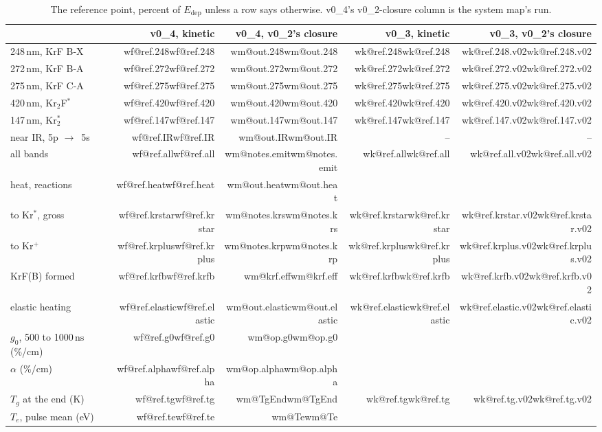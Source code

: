 \documentclass[11pt]{article}
\makeatletter
\newcommand\wk[1]{\ifcsname wk@#1\endcsname\csname wk@#1\endcsname
  \else\errmessage{no v0_3 number '#1'. Rerun make_overview_v0_3.py}\fi}
\newcommand\wm[1]{\ifcsname wm@#1\endcsname\csname wm@#1\endcsname
  \else\errmessage{no map number '#1'. Rerun make_system_map_v0_4.py}\fi}
\newcommand\wf[1]{\ifcsname wf@#1\endcsname\csname wf@#1\endcsname
  \else\errmessage{no v0_4 number '#1'. Rerun make_overview_v0_4.py}\fi}
\newcommand{\unit}[1]{\ensuremath{\,\mathrm{#1}}}
\newcommand{\Krs}{Kr\ensuremath{^*}}
\newcommand{\Krp}{Kr\ensuremath{^+}}
\newcommand{\Krts}{Kr\ensuremath{_2^*}}
\newcommand{\KtF}{Kr\ensuremath{_2}F\ensuremath{^*}}
\newcommand{\ra}{\ensuremath{\to}\ }
\newcommand{\Edep}{\ensuremath{E_\mathrm{dep}}}
\makeatother
\begin{document}
\begin{table}[H]
\centering\footnotesize
\begin{tabular}{@{}lrrrr@{}}
\toprule
 & v0\_4, kinetic & v0\_4, v0\_2's closure & v0\_3, kinetic & v0\_3, v0\_2's closure\\
\midrule
248\unit{nm}, KrF B-X & \wf{ref.248} & \wm{out.248} & \wk{ref.248} & \wk{ref.248.v02}\\
272\unit{nm}, KrF B-A & \wf{ref.272} & \wm{out.272} & \wk{ref.272} & \wk{ref.272.v02}\\
275\unit{nm}, KrF C-A & \wf{ref.275} & \wm{out.275} & \wk{ref.275} & \wk{ref.275.v02}\\
420\unit{nm}, \KtF{} & \wf{ref.420} & \wm{out.420} & \wk{ref.420} & \wk{ref.420.v02}\\
147\unit{nm}, \Krts{} & \wf{ref.147} & \wm{out.147} & \wk{ref.147} & \wk{ref.147.v02}\\
near IR, 5p \ra 5s & \wf{ref.IR} & \wm{out.IR} & -- & --\\
all bands & \wf{ref.all} & \wm{notes.emit} & \wk{ref.all} & \wk{ref.all.v02}\\
heat, reactions & \wf{ref.heat} & \wm{out.heat} & & \\
to \Krs{}, gross & \wf{ref.krstar} & \wm{notes.krs} & \wk{ref.krstar} & \wk{ref.krstar.v02}\\
to \Krp{} & \wf{ref.krplus} & \wm{notes.krp} & \wk{ref.krplus} & \wk{ref.krplus.v02}\\
KrF(B) formed & \wf{ref.krfb} & \wm{krf.eff} & \wk{ref.krfb} & \wk{ref.krfb.v02}\\
elastic heating & \wf{ref.elastic} & \wm{out.elastic} & \wk{ref.elastic} & \wk{ref.elastic.v02}\\
$g_0$, 500 to 1000\unit{ns} (\%/cm) & \wf{ref.g0} & \wm{op.g0} & & \\
$\alpha$ (\%/cm) & \wf{ref.alpha} & \wm{op.alpha} & & \\
$T_g$ at the end (K) & \wf{ref.tg} & \wm{TgEnd} & \wk{ref.tg} & \wk{ref.tg.v02}\\
$T_e$, pulse mean (eV) & \wf{ref.te} & \wm{Te} & & \\
\bottomrule
\end{tabular}
\caption{The reference point, percent of \Edep{} unless a row says
otherwise. v0\_4's v0\_2-closure column is the system map's run.}
\end{table}
\end{document}

